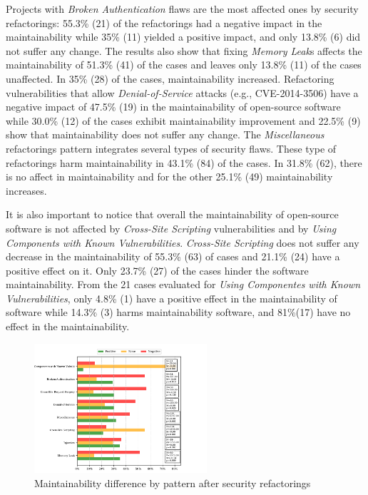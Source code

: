 \documentclass[10pt,conference]{IEEEtran}
\begin{document}
{Projects with \emph{Broken Authentication} flaws are the most affected ones by security
refactorings: 55.3\% (21) of the refactorings had a negative impact in the maintainability
while 35\% (11) yielded a positive impact, and only 13.8\% (6) did not suffer any
change. The results also show that fixing \emph{Memory Leak}s affects the maintainability
of 51.3\% (41) of the cases and leaves only 13.8\% (11) of the cases unaffected.
In 35\% (28) of the cases, maintainability increased. Refactoring vulnerabilities
that allow \emph{Denial-of-Service} attacks (e.g., CVE-2014-3506) have a negative impact
of 47.5\% (19) in the maintainability of open-source software while 30.0\% (12) of
the cases exhibit maintainability improvement and 22.5\% (9) show that
maintainability does not suffer any change. The \emph{Miscellaneous} refactorings pattern
integrates several types of security flaws. These type of refactorings harm maintainability in 43.1\% (84) of the cases. In 31.8\% (62), there is no affect in maintainability and for the other 25.1\% (49) maintainability increases.

It is also important to notice that overall the maintainability of open-source
software is not affected by \emph{Cross-Site Scripting} vulnerabilities and by \emph{Using
Components with Known Vulnerabilities}. \emph{Cross-Site Scripting} does not suffer any
decrease in the maintainability of 55.3\% (63) of cases and 21.1\% (24) have a
positive effect on it. Only 23.7\% (27) of the cases hinder the software
maintainability. From the 21 cases evaluated for \emph{Using Componentes with Known
Vulnerabilities}, only 4.8\% (1) have a positive effect in the maintainability
of software while 14.3\% (3) harms maintainability software, and 81\%(17) have no effect
in the maintainability.

\begin{figure}[h]
 	\centering
 	\includegraphics[width=0.57\textwidth]{figures/category.pdf}
 	\caption{Maintainability difference by pattern after security refactorings}
	\label{fig:pat}
\end{figure}

}
\end{document}
